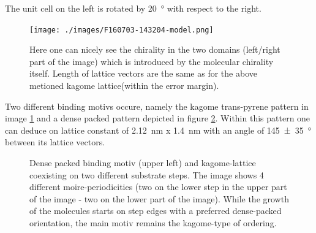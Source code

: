The unit cell on the left is rotated by \SI{20}{\degree} with respect to the right.

\begin{figure}[!h]
 \texttt{[image: ./images/F160703-143204-model.png]}
  \caption{Here one can nicely see the chirality in the two domains (left/right part of the image) which is introduced by the molecular chirality itself. Length of lattice vectors are the same as for the above metioned kagome lattice(within the error margin).}
  \label{fig:trans-kagome-chiral}
\end{figure}

Two different binding motivs occure, namely the kagome trans-pyrene pattern in image \ref{fig:trans-kagome-chiral} and a dense packed pattern depicted in figure \ref{fig:trans-dense-packed}. Within this pattern one can deduce on lattice constant of \SI{2.12}{\nm} x \SI{1.4}{\nm} with an angle of \SI{145(35)}{\degree} between its lattice vectors.

\begin{figure}[!h]
  \caption{Dense packed binding motiv (upper left) and kagome-lattice coexisting on two different substrate steps. The image shows 4 different moire-periodicities (two on the lower step in the upper part of the image - two on the lower part of the image). While the growth of the molecules starts on step edges with a preferred dense-packed orientation, the main motiv remains the kagome-type of ordering.}
 \label{fig:trans-dense-packed}
\end{figure}
